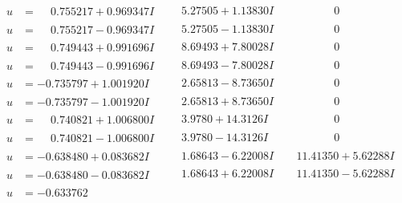 \documentclass[1p]{elsarticle_modified}
\theoremstyle{definition}
\begin{document}
$$\begin{array}{c|c|c}
\begin{aligned}
u &= \phantom{-}0.755217 + 0.969347 I\end{aligned}
 & \phantom{-}5.27505 + 1.13830 I & \phantom{-0.000000 } 0 \\ \hline\begin{aligned}
u &= \phantom{-}0.755217 - 0.969347 I\end{aligned}
 & \phantom{-}5.27505 - 1.13830 I & \phantom{-0.000000 } 0 \\ \hline\begin{aligned}
u &= \phantom{-}0.749443 + 0.991696 I\end{aligned}
 & \phantom{-}8.69493 + 7.80028 I & \phantom{-0.000000 } 0 \\ \hline\begin{aligned}
u &= \phantom{-}0.749443 - 0.991696 I\end{aligned}
 & \phantom{-}8.69493 - 7.80028 I & \phantom{-0.000000 } 0 \\ \hline\begin{aligned}
u &= -0.735797 + 1.001920 I\end{aligned}
 & \phantom{-}2.65813 - 8.73650 I & \phantom{-0.000000 } 0 \\ \hline\begin{aligned}
u &= -0.735797 - 1.001920 I\end{aligned}
 & \phantom{-}2.65813 + 8.73650 I & \phantom{-0.000000 } 0 \\ \hline\begin{aligned}
u &= \phantom{-}0.740821 + 1.006800 I\end{aligned}
 & \phantom{-}3.9780 + 14.3126 I & \phantom{-0.000000 } 0 \\ \hline\begin{aligned}
u &= \phantom{-}0.740821 - 1.006800 I\end{aligned}
 & \phantom{-}3.9780 - 14.3126 I & \phantom{-0.000000 } 0 \\ \hline\begin{aligned}
u &= -0.638480 + 0.083682 I\end{aligned}
 & \phantom{-}1.68643 - 6.22008 I & \phantom{-}11.41350 + 5.62288 I \\ \hline\begin{aligned}
u &= -0.638480 - 0.083682 I\end{aligned}
 & \phantom{-}1.68643 + 6.22008 I & \phantom{-}11.41350 - 5.62288 I \\ \hline\begin{aligned}
u &= -0.633762\phantom{ +0.000000I}\end{aligned}

\end{array}$$
\end{document}

